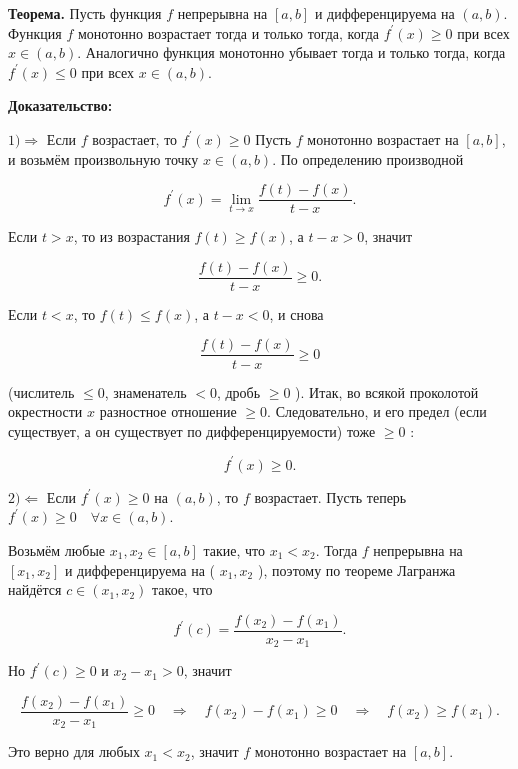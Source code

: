 \hspace{3mm}

\textbf{Теорема.}
Пусть функция $f$ непрерывна на $[a, b]$ и дифференцируема на $(a, b)$. Функция $f$ монотонно возрастает тогда и только тогда, когда $f^{\prime}(x) \geqslant 0$ при всех $x \in(a, b)$. Аналогично функция монотонно убывает тогда и только тогда, когда $f^{\prime}(x) \leqslant 0$ при всех $x \in(a, b)$.

\textbf{Доказательство:}

$1) \Longrightarrow$
Если $f$ возрастает, то $f^{\prime}(x) \geq 0$
Пусть $f$ монотонно возрастает на $[a, b]$, и возьмём произвольную точку $x \in(a, b)$.
По определению производной

$$
f^{\prime}(x)=\lim _{t \rightarrow x} \frac{f(t)-f(x)}{t-x} .
$$


Если $t>x$, то из возрастания $f(t) \geq f(x)$, а $t-x>0$, значит

$$
\frac{f(t)-f(x)}{t-x} \geq 0 .
$$


Если $t<x$, то $f(t) \leq f(x)$, а $t-x<0$, и снова

$$
\frac{f(t)-f(x)}{t-x} \geq 0
$$

(числитель $\leq 0$, знаменатель $<0$, дробь $\geq 0$ ).
Итак, во всякой проколотой окрестности $x$ разностное отношение $\geq 0$. Следовательно, и его предел (если существует, а он существует по дифференцируемости) тоже $\geq 0$ :

$$
f^{\prime}(x) \geq 0 .
$$

$2) \Longleftarrow$
Если $f^{\prime}(x) \geq 0$ на $(a, b)$, то $f$ возрастает.
Пусть теперь $f^{\prime}(x) \geq 0 \quad \forall x \in(a, b) .$

Возьмём любые $x_1, x_2 \in[a, b]$ такие, что $x_1<x_2$. Тогда $f$ непрерывна на $\left[x_1, x_2\right]$ и дифференцируема на ( $x_1, x_2$ ), поэтому по теореме Лагранжа найдётся $c \in\left(x_1, x_2\right)$ такое, что

$$
f^{\prime}(c)=\frac{f\left(x_2\right)-f\left(x_1\right)}{x_2-x_1} .
$$


Но $f^{\prime}(c) \geq 0$ и $x_2-x_1>0$, значит

$$
\frac{f\left(x_2\right)-f\left(x_1\right)}{x_2-x_1} \geq 0 \quad \Rightarrow \quad f\left(x_2\right)-f\left(x_1\right) \geq 0 \quad \Rightarrow \quad f\left(x_2\right) \geq f\left(x_1\right) .
$$

Это верно для любых $x_1<x_2$, значит $f$ монотонно возрастает на $[a, b]$.

\hspace{3mm}

